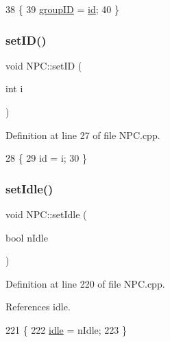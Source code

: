 \begin{DoxyCode}
38 \{
39     \hyperlink{class_n_p_c_ab370e8a4fbb5ccabdc06821f7dfda428}{groupID} = \hyperlink{class_n_p_c_a1b705223f885df652f2faffc4735d03c}{id};
40 \}
\end{DoxyCode}
\mbox{\label{class_n_p_c_a81d67fe2002ad57334c40fadcba25dc4}} 
\subsubsection{\texorpdfstring{set\+I\+D()}{setID()}}
{\footnotesize\ttfamily void N\+P\+C\+::set\+ID (\begin{DoxyParamCaption}\item[{int}]{i }\end{DoxyParamCaption})}



Definition at line 27 of file N\+P\+C.\+cpp.


\begin{DoxyCode}
28 \{
29     \textcolor{keywordtype}{id} = i;
30 \}
\end{DoxyCode}
\mbox{\label{class_n_p_c_a154d9c6f7c920edcfaeb20f826419ac6}} 
\subsubsection{\texorpdfstring{set\+Idle()}{setIdle()}}
{\footnotesize\ttfamily void N\+P\+C\+::set\+Idle (\begin{DoxyParamCaption}\item[{bool}]{n\+Idle }\end{DoxyParamCaption})}



Definition at line 220 of file N\+P\+C.\+cpp.



References idle.


\begin{DoxyCode}
221 \{
222     \hyperlink{class_n_p_c_aa228d3e449507a6326cef7b449752e62}{idle} = nIdle;
223 \}
\end{DoxyCode}
\mbox{\label{class_n_p_c_af18588e2baa382f12e4e9fe56fc247bc}} 
